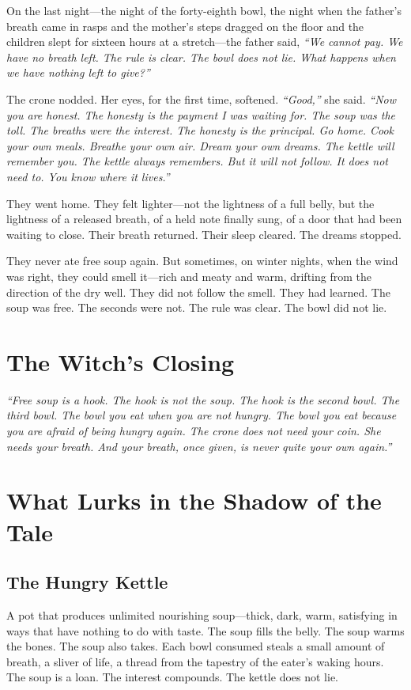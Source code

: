 On the last night---the night of the forty-eighth bowl, the night when the father's breath came in rasps and the mother's steps dragged on the floor and the children slept for sixteen hours at a stretch---the father said, \textit{``We cannot pay. We have no breath left. The rule is clear. The bowl does not lie. What happens when we have nothing left to give?''}

The crone nodded. Her eyes, for the first time, softened. \textit{``Good,''} she said. \textit{``Now you are honest. The honesty is the payment I was waiting for. The soup was the toll. The breaths were the interest. The honesty is the principal. Go home. Cook your own meals. Breathe your own air. Dream your own dreams. The kettle will remember you. The kettle always remembers. But it will not follow. It does not need to. You know where it lives.''}

They went home. They felt lighter---not the lightness of a full belly, but the lightness of a released breath, of a held note finally sung, of a door that had been waiting to close. Their breath returned. Their sleep cleared. The dreams stopped.

They never ate free soup again. But sometimes, on winter nights, when the wind was right, they could smell it---rich and meaty and warm, drifting from the direction of the dry well. They did not follow the smell. They had learned. The soup was free. The seconds were not. The rule was clear. The bowl did not lie.

\section*{The Witch's Closing}
\textit{``Free soup is a hook. The hook is not the soup. The hook is the second bowl. The third bowl. The bowl you eat when you are not hungry. The bowl you eat because you are afraid of being hungry again. The crone does not need your coin. She needs your breath. And your breath, once given, is never quite your own again.''}

\section*{What Lurks in the Shadow of the Tale}

\subsection*{The Hungry Kettle}

A pot that produces unlimited nourishing soup---thick, dark, warm, satisfying in ways that have nothing to do with taste. The soup fills the belly. The soup warms the bones. The soup also takes. Each bowl consumed steals a small amount of breath, a sliver of life, a thread from the tapestry of the eater's waking hours. The soup is a loan. The interest compounds. The kettle does not lie.

